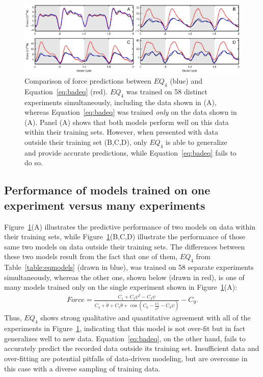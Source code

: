 \documentclass[fleqn,10pt]{wlscirep}
\begin{document}
\begin{figure}[ht]
\centering
\includegraphics[width=\textwidth]{figures/eq_goodbad_PNAS}
\caption{Comparison of force predictions between $EQ_4$ (blue) and Equation~\eqref{eq:badeq} (red).
  $EQ_4$ was trained on 58 distinct experiments simultaneously, including the data shown in (A),
  whereas Equation~\eqref{eq:badeq} was trained \emph{only} on the data shown in (A).  Panel (A)
  shows that both models perform well on this data within their training sets.  However, when
  presented with data outside their training set (B,C,D), only $EQ_4$ is able to generalize and
  provide accurate predictions, while Equation~\eqref{eq:badeq} fails to do so.}
\label{fig:eq_goodbad}
\end{figure}

\subsection{Performance of models trained on one experiment versus many experiments}
Figure~\ref{fig:eq_goodbad}(A) illustrates the predictive performance of two models on data within their training sets, while Figure~\ref{fig:eq_goodbad}(B,C,D) illustrate the performance of those same two models on data outside their training sets. The differences between these two models result from the fact that one of them, $EQ_4$ from Table~\ref{table:eqmodels} (drawn in blue), was trained on 58 separate experiments simultaneously, whereas the other one, shown below (drawn in red), is one of many models trained only on the single experiment shown in Figure~\ref{fig:eq_goodbad}(A):
\begin{align}
 Force = \frac{C_1 + C_2\psi^2 - C_3\psi}{C_4 + \ddot{\theta} + C_5\dot{\theta} + \cos(C_6 -
  \frac{C_7}{\psi^2} - C_8\psi)} - C_9.
\label{eq:badeq}
\end{align}
Thus, $EQ_4$ shows strong qualitative and quantitative agreement with all of the experiments in Figure~\ref{fig:eq_goodbad}, indicating that this model is not over-fit but in fact generalizes well to new data. Equation~\eqref{eq:badeq}, on the other hand, fails to accurately predict the recorded data outside its training set.  Insufficient data and over-fitting are potential pitfalls of data-driven modeling, but are overcome in this case with a diverse sampling of training data.
\end{document}
